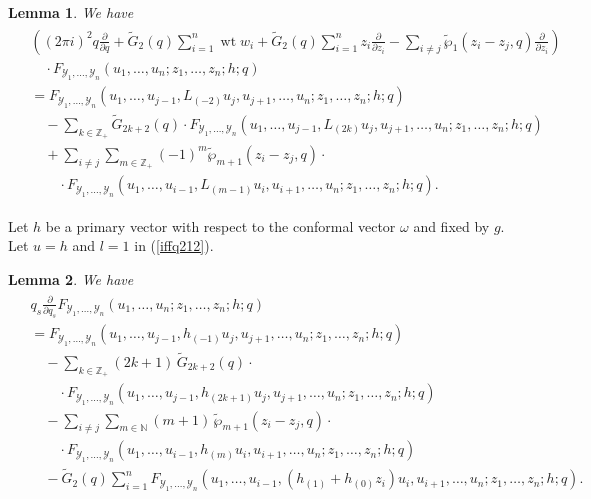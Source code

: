 \documentclass[9pt]{amsart}
\newtheorem{lemma}{Lemma}[section]
\begin{document}
\begin{lemma}\label{operator}
We have 
\begin{align}
\begin{split}
    & \left(
        (2\pi i)^2 q \frac{\partial}{\partial q}
        + \tilde{G}_2(q) \sum_{i=1}^{n} \operatorname{wt} w_i
        + \tilde{G}_2(q) \sum_{i=1}^{n} z_i \frac{\partial}{\partial z_i}
        - \sum_{i \neq j} \tilde{\wp}_1(z_i - z_j, q) \frac{\partial}{\partial z_i}
    \right) \\
    &\quad \cdot 
    F_{\mathcal{Y}_1, \dots, \mathcal{Y}_n}(u_1, \dots, u_n; z_1, \dots, z_n; h; q) \\
    &= 
    F_{\mathcal{Y}_1, \dots, \mathcal{Y}_n}(
    u_1, \dots, u_{j-1}, L_{(-2)} u_j, u_{j+1}, \dots, u_n;
    z_1, \dots, z_n; h; q) \\
    &\quad - \sum_{k \in \mathbb{Z}_+} \tilde{G}_{2k+2}(q) \cdot 
    F_{\mathcal{Y}_1, \dots, \mathcal{Y}_n}(
    u_1, \dots, u_{j-1}, L_{(2k)} u_j, u_{j+1}, \dots, u_n; 
    z_1, \dots, z_n; h; q) \\
    &\quad + \sum_{i \neq j} \sum_{m \in \mathbb{Z}_+} (-1)^m \tilde{\wp}_{m+1}(z_i - z_j, q) \cdot \\
    &\qquad \cdot F_{\mathcal{Y}_1, \dots, \mathcal{Y}_n}(
    u_1, \dots, u_{i-1}, L_{(m-1)} u_i, u_{i+1}, \dots, u_n;
    z_1, \dots, z_n; h; q).
\end{split}
\end{align}
\end{lemma}

\noindent Let $h$ be a primary vector with respect to the conformal vector $\omega$ and fixed by $g$. Let $u = h$ and $l = 1$ in (\ref{iffq212}). 
\begin{lemma}\label{6.13}
We have
\begin{align}
\begin{split}
& q_s \frac{\partial}{\partial q_s}
F_{\mathcal{Y}_{1}, \dots, \mathcal{Y}_{n}}(
u_1, \dots, u_n; z_1, \dots, z_n; h; q) \\
&= F_{\mathcal{Y}_{1}, \dots, \mathcal{Y}_{n}}(
u_1, \dots, u_{j-1}, h_{(-1)} u_j, u_{j+1}, \dots, u_n;
z_1, \dots, z_n; h; q) \\
&\quad - \sum_{k \in \mathbb{Z}_+} (2k + 1)\, \tilde{G}_{2k+2}(q) \cdot \\
&\qquad \cdot F_{\mathcal{Y}_{1}, \dots, \mathcal{Y}_{n}}(
u_1, \dots, u_{j-1}, h_{(2k+1)} u_j, u_{j+1}, \dots, u_n;
z_1, \dots, z_n; h; q) \\
&\quad - \sum_{i \neq j} \sum_{m \in \mathbb{N}} (m + 1)\, \tilde{\wp}_{m+1}(z_i - z_j, q) \cdot \\
&\qquad \cdot F_{\mathcal{Y}_{1}, \dots, \mathcal{Y}_{n}}(
u_1, \dots, u_{i-1}, h_{(m)} u_i, u_{i+1}, \dots, u_n;
z_1, \dots, z_n; h; q) \\
&\quad - \tilde{G}_2(q) \sum_{i=1}^{n}
F_{\mathcal{Y}_{1}, \dots, \mathcal{Y}_{n}}(
u_1, \dots, u_{i-1}, (h_{(1)} + h_{(0)} z_i) u_i, u_{i+1}, \dots, u_n;
z_1, \dots, z_n; h; q).
\end{split}
\end{align}
\end{lemma}
\end{document}
